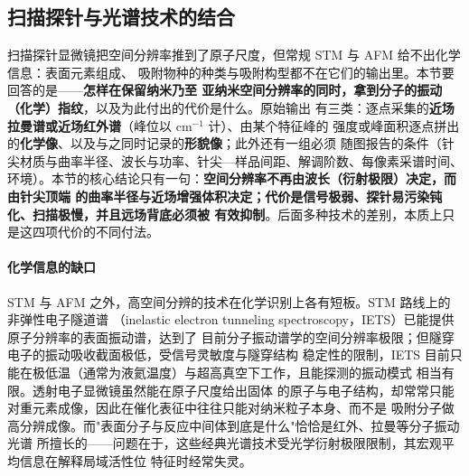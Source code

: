 
\subsection{扫描探针与光谱技术的结合}
\label{sec:nano-intro}

\begin{probout}
扫描探针显微镜把空间分辨率推到了原子尺度，但常规 STM 与 AFM 给不出化学信息：表面元素组成、
吸附物种的种类与吸附构型都不在它们的输出里。本节要回答的是——\textbf{怎样在保留纳米乃至
亚纳米空间分辨率的同时，拿到分子的振动（化学）指纹}，以及为此付出的代价是什么。原始输出
有三类：逐点采集的\textbf{近场拉曼谱或近场红外谱}（峰位以 cm$^{-1}$ 计）、由某个特征峰的
强度或峰面积逐点拼出的\textbf{化学像}、以及与之同时记录的\textbf{形貌像}；此外还有一组必须
随图报告的条件（针尖材质与曲率半径、波长与功率、针尖—样品间距、解调阶数、每像素采谱时间、
环境）。本节的核心结论只有一句：\textbf{空间分辨率不再由波长（衍射极限）决定，而由针尖顶端
的曲率半径与近场增强体积决定；代价是信号极弱、探针易污染钝化、扫描极慢，并且远场背底必须被
有效抑制}。后面多种技术的差别，本质上只是这四项代价的不同付法。
\end{probout}

\paragraph{化学信息的缺口}
STM 与 AFM 之外，高空间分辨的技术在化学识别上各有短板。STM 路线上的非弹性电子隧道谱
（inelastic electron tunneling spectroscopy，IETS）已能提供原子分辨率的表面振动谱，达到了
目前分子振动谱学的空间分辨率极限；但隧穿电子的振动吸收截面极低，受信号灵敏度与隧穿结构
稳定性的限制，IETS 目前只能在极低温（通常为液氦温度）与超高真空下工作，且能探测的振动模式
相当有限。透射电子显微镜虽然能在原子尺度给出固体
的原子与电子结构，却常常只能对重元素成像，因此在催化表征中往往只能对纳米粒子本身、而不是
吸附分子做高分辨成像。而"表面分子与反应中间体到底是什么"恰恰是红外、拉曼等分子振动光谱
所擅长的——问题在于，这些经典光谱技术受光学衍射极限限制，其宏观平均信息在解释局域活性位
特征时经常失灵。

